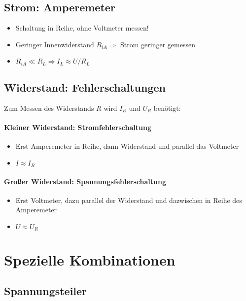 \subsection{Strom: Amperemeter}

\begin{itemize}
  \item Schaltung in Reihe, ohne Voltmeter messen!
  \item Geringer Innenwiderstand $R_{iA} \Rightarrow$ Strom geringer gemessen
  \item $R_{iA} \ll R_L \Rightarrow I_L \approx U/R_L$
\end{itemize}

\subsection{Widerstand: Fehlerschaltungen}

Zum Messen des Widerstands $R$ wird $I_R$ und $U_R$ benötigt:

\paragraph{Kleiner Widerstand: Stromfehlerschaltung}

\begin{itemize}
  \item Erst Amperemeter in Reihe, dann Widerstand und parallel das Voltmeter
  \item $I \approx I_R$
\end{itemize}

\paragraph{Gro\ss er Widerstand: Spannungsfehlerschaltung}

\begin{itemize}
  \item Erst Voltmeter, dazu parallel der Widerstand und dazwischen in Reihe des Amperemeter
  \item $U \approx U_R$
\end{itemize}

\section{Spezielle Kombinationen}

\subsection{Spannungsteiler}

